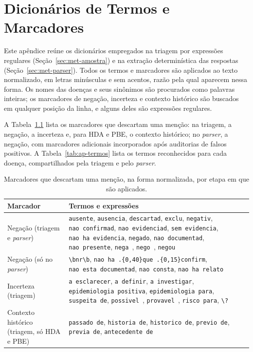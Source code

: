 \chapter{Dicionários de Termos e Marcadores}\label{ap:dicionarios}

Este apêndice reúne os dicionários empregados na triagem por expressões regulares (Seção~\ref{sec:met-amostra}) e na extração determinística das respostas (Seção~\ref{sec:met-parser}). Todos os termos e marcadores são aplicados ao texto normalizado, em letras minúsculas e sem acentos, razão pela qual aparecem nessa forma. Os nomes das doenças e seus sinônimos são procurados como palavras inteiras; os marcadores de negação, incerteza e contexto histórico são buscados em qualquer posição da linha, e alguns deles são expressões regulares.

A Tabela~\ref{tab:ap-marcadores} lista os marcadores que descartam uma menção: na triagem, a negação, a incerteza e, para HDA e PBE, o contexto histórico; no \textit{parser}, a negação, com marcadores adicionais incorporados após auditorias de falsos positivos. A Tabela~\ref{tab:ap-termos} lista os termos reconhecidos para cada doença, compartilhados pela triagem e pelo \textit{parser}.

\begin{table}[H]
\centering
\caption[Marcadores de negação, incerteza e contexto histórico]{Marcadores que descartam uma menção, na forma normalizada, por etapa em que são aplicados.}
\label{tab:ap-marcadores}
\small
\renewcommand{\arraystretch}{1.25}
\begin{tabular}{@{}>{\raggedright\arraybackslash}p{3.4cm}p{11.2cm}@{}}
\toprule
Marcador & Termos e expressões \\
\midrule
Negação (triagem e \textit{parser}) & \raggedright \texttt{ausente}, \texttt{ausencia}, \texttt{descartad}, \texttt{exclu}, \texttt{negativ}, \texttt{nao\ confirmad}, \texttt{nao\ evidenciad}, \texttt{sem\ evidencia}, \texttt{nao\ ha\ evidencia}, \texttt{negado}, \texttt{nao\ documentad}, \texttt{nao\ presente}, \texttt{nega\ }, \texttt{nego\ }, \texttt{negou\ } \tabularnewline
Negação (só no \textit{parser}) & \raggedright \texttt{\textbackslash{}bnr\textbackslash{}b}, \texttt{nao\ ha\ .\{0,40\}que\ .\{0,15\}confirm}, \texttt{nao\ esta\ documentad}, \texttt{nao\ consta}, \texttt{nao\ ha\ relato} \tabularnewline
Incerteza (triagem) & \raggedright \texttt{a\ esclarecer}, \texttt{a\ definir}, \texttt{a\ investigar}, \texttt{epidemiologia\ positiva}, \texttt{epidemiologia\ para}, \texttt{suspeita\ de}, \texttt{possivel\ }, \texttt{provavel\ }, \texttt{risco\ para}, \texttt{\textbackslash{}?} \tabularnewline
Contexto histórico (triagem, só HDA e PBE) & \raggedright \texttt{passado\ de}, \texttt{historia\ de}, \texttt{historico\ de}, \texttt{previo\ de}, \texttt{previa\ de}, \texttt{antecedente\ de} \tabularnewline
\bottomrule
\end{tabular}
\par{}
\end{table}

